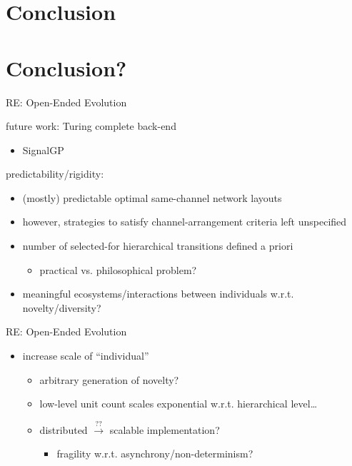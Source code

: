 \section{Conclusion}

\section{Conclusion?}

\begin{frame}{RE: Open-Ended Evolution}

future work: Turing complete back-end
\begin{itemize}
\item SignalGP \cite{lalejini2018evolving}
\end{itemize}

\pause
\vspace{2ex}

predictability/rigidity:
\begin{itemize}[<+->]
\item (mostly) predictable optimal same-channel network layouts
\item however, strategies to satisfy channel-arrangement criteria left unspecified
\item number of selected-for hierarchical transitions defined a priori
\begin{itemize}[<+->]
\item practical vs. philosophical problem?
\end{itemize}
\item meaningful ecosystems/interactions between individuals w.r.t. novelty/diversity? \cite{soros2014identifying,dolson2018evolution}
\end{itemize}

\end{frame}

\begin{frame}{RE: Open-Ended Evolution}

\begin{itemize}[<+->]
\item increase scale of ``individual''
  \begin{itemize}
  \item arbitrary generation of novelty? \cite{banzhaf2015open}
  \item low-level unit count scales exponential w.r.t. hierarchical level\dots
  \item distributed $\stackrel{??}{\rightarrow}$ scalable implementation?
  \begin{itemize}
    \item fragility w.r.t. asynchrony/non-determinism? \cite{ackley2016indefinite}
  \end{itemize}
  \end{itemize}
\end{itemize}

\end{frame}


